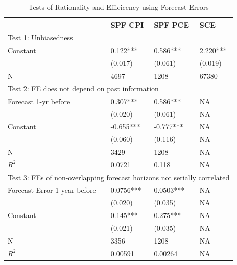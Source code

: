 \documentclass[]{article}
\begin{document}
\begin{table}[ht]
	\caption{Tests of Rationality and Efficicency using Forecast Errors}
	\label{NullTestTable}
	\centering 
\begin{tabular}{llll}
	\hline 
	& SPF CPI          & SPF PCE          & SCE            \\
	\hline 
	\multicolumn{4}{l}{Test 1: Unbiasedness}                                                           \\
	\hline 
	Constant                            & 0.122***         & 0.586***         & 2.220***       \\
	& (0.017)          & (0.061)          & (0.019)        \\
	\hline 
	N                                   & 4697             & 1208             & 67380          \\
	\hline 
	\multicolumn{4}{l}{Test 2: FE does not depend on past information}                                  \\
	\hline 
	Forecast 1-yr before                & 0.307***         & 0.586***         & NA             \\
	& (0.020)          & (0.061)          & NA             \\
	Constant                            & -0.655***        & -0.777***        & NA             \\
	& (0.060)          & (0.116)          & NA             \\
	\hline 
	N                                   & 3429             & 1208             & NA             \\
	$R^2$                 & 0.0721           & 0.118            & NA             \\
	\hline 
	\multicolumn{4}{l}{Test 3: FEs of non-overlapping forecast horizons not serially correlated} \\
	\hline 
	Forecast Error 1-year before        & 0.0756***        & 0.0503***        & NA             \\
	& (0.020)          & (0.035)          & NA             \\
	Constant                            & 0.145***         & 0.275***         & NA             \\
	& (0.021)          & (0.035)          & NA             \\
	\hline 
	N                                   & 3356             & 1208             & NA             \\
	$R^2$                   & 0.00591          & 0.00264          & NA             \\

\end{tabular}
\end{table}
\end{document}
